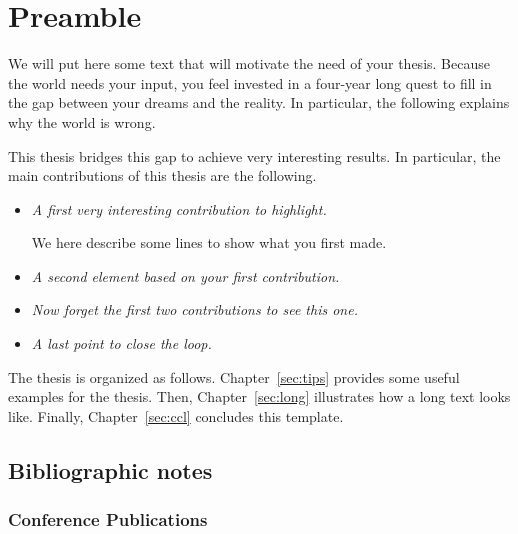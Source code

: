 \chapter*{Preamble}

We will put here some text that will motivate the need of your thesis.
Because the world needs your input, you feel invested in a four-year long quest to fill in the gap between your dreams and the reality.
In particular, the following explains why the world is wrong.

\lipsum[42]

This thesis bridges this gap to achieve very interesting results.
In particular, the main contributions of this thesis are the following.

\begin{itemize}
\item \textit{A first very interesting contribution to highlight.}

We here describe some lines to show what you first made.
\lipsum[2]

\item \textit{A second element based on your first contribution.}

\lipsum[5-6]

\item \textit{Now forget the first two contributions to see this one.}

\lipsum[9]

\item \textit{A last point to close the loop.}

\lipsum[13] 

\end{itemize}

The thesis is organized as follows.
Chapter~\ref{sec:tips} provides some useful examples for the thesis.
Then, Chapter~\ref{sec:long} illustrates how a long text looks like.
Finally, Chapter~\ref{sec:ccl} concludes this template.

\newpage

\section*{Bibliographic notes}

\subsection*{Conference Publications}

